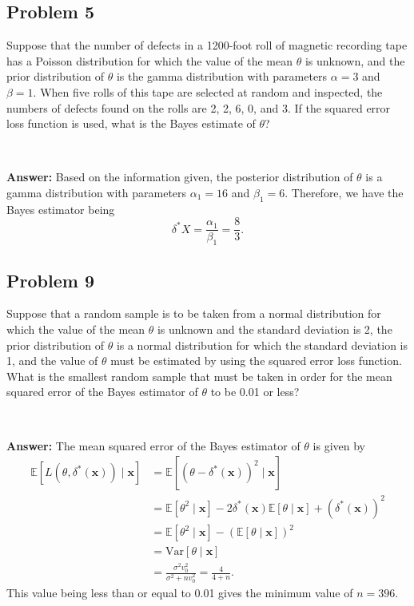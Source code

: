 \documentclass{article}
\begin{document}
\bigskip

\subsection*{Problem 5}
Suppose that the number of defects in a 1200-foot roll of magnetic recording tape has a Poisson distribution for which the value of the mean $\theta$ is unknown, and the prior distribution of $\theta$ is the gamma distribution with parameters $\alpha = 3$ and $\beta = 1$. When five rolls of this tape are selected at random and inspected, the numbers of defects found on the rolls are 2, 2, 6, 0, and 3. If the squared error loss function is used, what is the Bayes estimate of $\theta$?

\

\textbf{Answer:} Based on the information given, the posterior distribution of $\theta$ is a gamma distribution with parameters $\alpha_1 = 16$ and $\beta_1 = 6$. Therefore, we have the Bayes estimator being
\begin{equation*}
\delta^*{X} = \frac{\alpha_1}{\beta_1} = \frac{8}{3}.
\end{equation*}


\subsection*{Problem 9}
Suppose that a random sample is to be taken from a normal distribution for which the value of the mean $\theta$ is unknown and the standard deviation is 2, the prior distribution of $\theta$ is a normal distribution for which the standard deviation is 1, and the value of $\theta$ must be estimated by using the squared error loss function. What is the smallest random sample that must be taken in order for the mean squared error of the Bayes estimator of $\theta$ to be 0.01 or less?

\

\textbf{Answer:} The mean squared error of the Bayes estimator of $\theta$ is given by
\begin{align*}
\mathbb{E}[L(\theta, \delta^*(\boldsymbol{x})) \mid \boldsymbol{x}] &= \mathbb{E}[(\theta - \delta^*(\boldsymbol{x}))^2 \mid \boldsymbol{x}] \\
&= \mathbb{E}[\theta^2 \mid \boldsymbol{x}] - 2 \delta^*(\boldsymbol{x}) \mathbb{E}[\theta \mid \boldsymbol{x}] + (\delta^*(\boldsymbol{x}))^2 \\
&= \mathbb{E}[\theta^2 \mid \boldsymbol{x}] - (\mathbb{E}[\theta \mid \boldsymbol{x}])^2 \\
&= \text{Var}[\theta \mid \boldsymbol{x}] \\
&= \frac{\sigma^2 v_0^2}{\sigma^2 + n v_0^2} = \frac{4}{4 + n}.
\end{align*}
This value being less than or equal to 0.01 gives the minimum value of $n = 396$.
\end{document}
